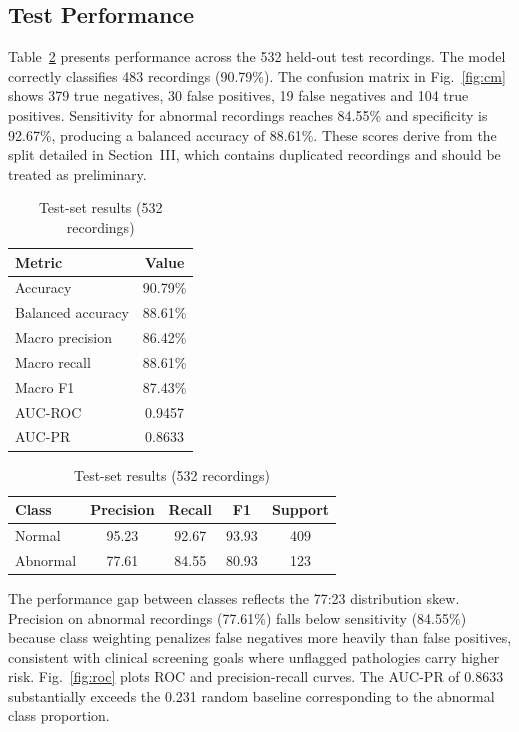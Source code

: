 \documentclass[conference]{IEEEtran}
\begin{document}
\subsection{Test Performance}
Table~\ref{tab:metrics} presents performance across the 532 held-out test recordings. The model correctly classifies 483 recordings (90.79\%). The confusion matrix in Fig.~\ref{fig:cm} shows 379 true negatives, 30 false positives, 19 false negatives and 104 true positives. Sensitivity for abnormal recordings reaches 84.55\% and specificity is 92.67\%, producing a balanced accuracy of 88.61\%. These scores derive from the split detailed in Section~III, which contains duplicated recordings and should be treated as preliminary.

\begin{table}[t]
\caption{Test-set results (532 recordings)}
\label{tab:metrics}
\centering
\footnotesize
\begin{tabular}{lc}
\toprule
Metric & Value \\
\midrule
Accuracy & 90.79\% \\
Balanced accuracy & 88.61\% \\
Macro precision & 86.42\% \\
Macro recall & 88.61\% \\
Macro F1 & 87.43\% \\
AUC-ROC & 0.9457 \\
AUC-PR & 0.8633 \\
\bottomrule
\end{tabular}

\vspace{4pt}
\begin{tabular}{lcccc}
\toprule
Class & Precision & Recall & F1 & Support \\
\midrule
Normal & 95.23 & 92.67 & 93.93 & 409 \\
Abnormal & 77.61 & 84.55 & 80.93 & 123 \\
\bottomrule
\end{tabular}
\end{table}

The performance gap between classes reflects the 77:23 distribution skew. Precision on abnormal recordings (77.61\%) falls below sensitivity (84.55\%) because class weighting penalizes false negatives more heavily than false positives, consistent with clinical screening goals where unflagged pathologies carry higher risk. Fig.~\ref{fig:roc} plots ROC and precision-recall curves. The AUC-PR of 0.8633 substantially exceeds the 0.231 random baseline corresponding to the abnormal class proportion.
\end{document}
